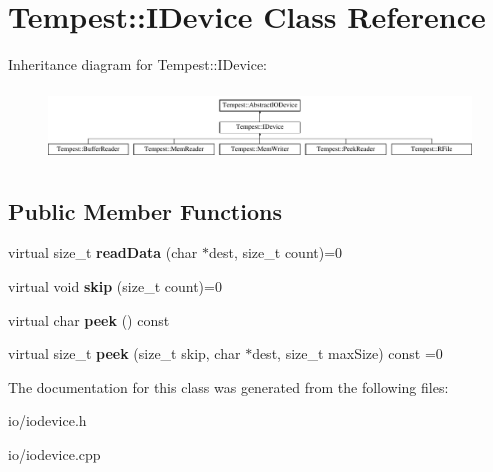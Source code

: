\hypertarget{class_tempest_1_1_i_device}{\section{Tempest\+:\+:I\+Device Class Reference}
\label{class_tempest_1_1_i_device}
}
Inheritance diagram for Tempest\+:\+:I\+Device\+:\begin{figure}[H]
\begin{center}
\leavevmode
\includegraphics[height=1.953488cm]{class_tempest_1_1_i_device}
\end{center}
\end{figure}
\subsection*{Public Member Functions}
\begin{DoxyCompactItemize}
\item 
\hypertarget{class_tempest_1_1_i_device_a0d8757120f5723b40457661052de8f96}{virtual size\+\_\+t {\bfseries read\+Data} (char $\ast$dest, size\+\_\+t count)=0}\label{class_tempest_1_1_i_device_a0d8757120f5723b40457661052de8f96}

\item 
\hypertarget{class_tempest_1_1_i_device_ab5848e89bae0b736447a42d3619836b9}{virtual void {\bfseries skip} (size\+\_\+t count)=0}\label{class_tempest_1_1_i_device_ab5848e89bae0b736447a42d3619836b9}

\item 
\hypertarget{class_tempest_1_1_i_device_a86b8d56eb4bb292d3dfa8e900d0d7bb6}{virtual char {\bfseries peek} () const }\label{class_tempest_1_1_i_device_a86b8d56eb4bb292d3dfa8e900d0d7bb6}

\item 
\hypertarget{class_tempest_1_1_i_device_a8ff3eaf2a35f42cdb61af5da685b4b71}{virtual size\+\_\+t {\bfseries peek} (size\+\_\+t skip, char $\ast$dest, size\+\_\+t max\+Size) const =0}\label{class_tempest_1_1_i_device_a8ff3eaf2a35f42cdb61af5da685b4b71}

\end{DoxyCompactItemize}


The documentation for this class was generated from the following files\+:\begin{DoxyCompactItemize}
\item 
io/iodevice.\+h\item 
io/iodevice.\+cpp\end{DoxyCompactItemize}
